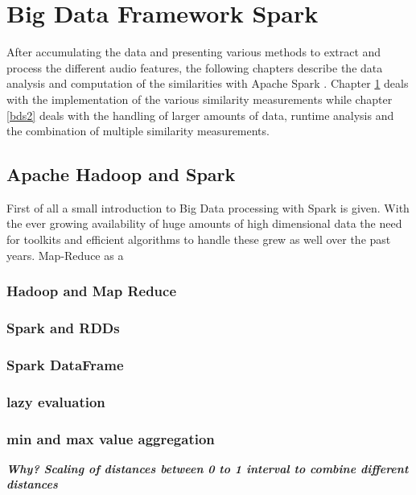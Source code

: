 
\chapter{Big Data Framework Spark}\label{bds1}

After accumulating the data and presenting various methods to extract and process the different audio features, the following chapters describe the data analysis and computation of the similarities with Apache Spark \cite{spark}. Chapter \ref{bds1} deals with the implementation of the various similarity measurements while chapter \ref{bds2} deals with the handling of larger amounts of data, runtime analysis and the combination of multiple similarity measurements. 

\section{Apache Hadoop and Spark} 

First of all a small introduction to Big Data processing with Spark is given.
With the ever growing availability of huge amounts of high dimensional data the need for toolkits and efficient algorithms to handle these grew as well over the past years. Map-Reduce as a 

\subsection{Hadoop and Map Reduce}

\subsection{Spark and RDDs}

\subsection{Spark DataFrame}

\subsection{lazy evaluation}

\subsection{min and max value aggregation}

\textit{\textbf{Why? Scaling of distances between 0 to 1 interval to combine different distances\\}}

